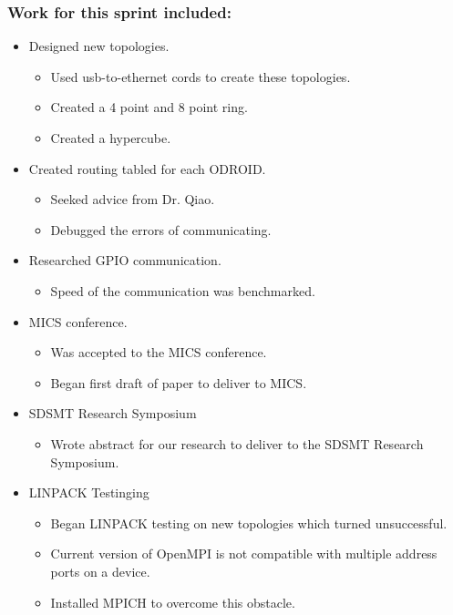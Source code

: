 \subsubsection*{Work for this sprint included:}
\begin{itemize}
	\item Designed new topologies.
	\begin{itemize}
		\item Used usb-to-ethernet cords to create these topologies.
		\item Created a 4 point and 8 point ring.
		\item Created a hypercube.
	\end{itemize}
	\item Created routing tabled for each ODROID.
	\begin{itemize}
		\item Seeked advice from Dr. Qiao.
		\item Debugged the errors of communicating.
	\end{itemize}
	\item Researched GPIO communication.
	\begin{itemize}
		\item Speed of the communication was benchmarked.
	\end{itemize} 
	\item MICS conference.
	\begin{itemize}
		\item Was accepted to the MICS conference.
		\item Began first draft of paper to deliver to MICS.
	\end{itemize}
	\item SDSMT Research Symposium
	\begin{itemize}
		\item Wrote abstract for our research to deliver to the SDSMT Research Symposium.
	\end{itemize}
	\item LINPACK Testinging
	\begin{itemize}
		\item Began LINPACK testing on new topologies which turned unsuccessful.
		\item Current version of OpenMPI is not compatible with multiple address ports on a device.
		\item Installed MPICH to overcome this obstacle.
	\end{itemize}
\end{itemize}

